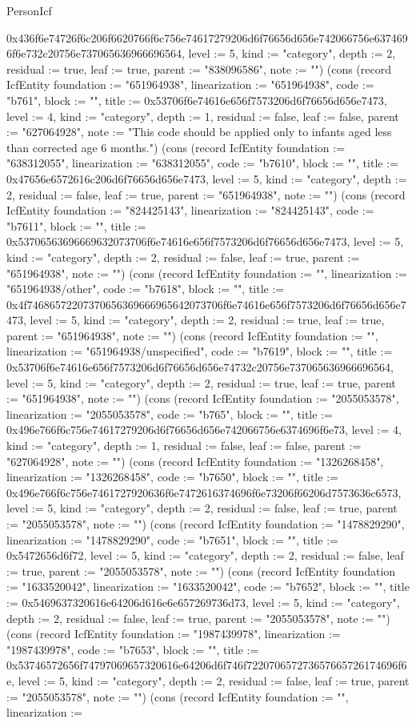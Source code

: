 \begin{lexlean}{PersonIcf}
\begin{semanticmodule}
{0x436f6e74726f6c206f6620766f6c756e74617279206d6f76656d656e742066756e6374696f6e732c20756e737065636966696564, level := 5, kind := "category", depth := 2, residual := true, leaf := true, parent := "838096586", note := ""}) (cons (record IcfEntity {foundation := "651964938", linearization := "651964938", code := "b761", block := "", title := 0x53706f6e74616e656f7573206d6f76656d656e7473, level := 4, kind := "category", depth := 1, residual := false, leaf := false, parent := "627064928", note := "This code should be applied only to infants aged less than corrected age 6 months."}) (cons (record IcfEntity {foundation := "638312055", linearization := "638312055", code := "b7610", block := "", title := 0x47656e6572616c206d6f76656d656e7473, level := 5, kind := "category", depth := 2, residual := false, leaf := true, parent := "651964938", note := ""}) (cons (record IcfEntity {foundation := "824425143", linearization := "824425143", code := "b7611", block := "", title := 0x53706563696669632073706f6e74616e656f7573206d6f76656d656e7473, level := 5, kind := "category", depth := 2, residual := false, leaf := true, parent := "651964938", note := ""}) (cons (record IcfEntity {foundation := "", linearization := "651964938/other", code := "b7618", block := "", title := 0x4f74686572207370656369666965642073706f6e74616e656f7573206d6f76656d656e7473, level := 5, kind := "category", depth := 2, residual := true, leaf := true, parent := "651964938", note := ""}) (cons (record IcfEntity {foundation := "", linearization := "651964938/unspecified", code := "b7619", block := "", title := 0x53706f6e74616e656f7573206d6f76656d656e74732c20756e737065636966696564, level := 5, kind := "category", depth := 2, residual := true, leaf := true, parent := "651964938", note := ""}) (cons (record IcfEntity {foundation := "2055053578", linearization := "2055053578", code := "b765", block := "", title := 0x496e766f6c756e74617279206d6f76656d656e742066756e6374696f6e73, level := 4, kind := "category", depth := 1, residual := false, leaf := false, parent := "627064928", note := ""}) (cons (record IcfEntity {foundation := "1326268458", linearization := "1326268458", code := "b7650", block := "", title := 0x496e766f6c756e7461727920636f6e7472616374696f6e73206f66206d7573636c6573, level := 5, kind := "category", depth := 2, residual := false, leaf := true, parent := "2055053578", note := ""}) (cons (record IcfEntity {foundation := "1478829290", linearization := "1478829290", code := "b7651", block := "", title := 0x5472656d6f72, level := 5, kind := "category", depth := 2, residual := false, leaf := true, parent := "2055053578", note := ""}) (cons (record IcfEntity {foundation := "1633520042", linearization := "1633520042", code := "b7652", block := "", title := 0x5469637320616e64206d616e6e657269736d73, level := 5, kind := "category", depth := 2, residual := false, leaf := true, parent := "2055053578", note := ""}) (cons (record IcfEntity {foundation := "1987439978", linearization := "1987439978", code := "b7653", block := "", title := 0x53746572656f74797069657320616e64206d6f746f722070657273657665726174696f6e, level := 5, kind := "category", depth := 2, residual := false, leaf := true, parent := "2055053578", note := ""}) (cons (record IcfEntity {foundation := "", linearization := }
\end{semanticmodule}
\end{lexlean}
